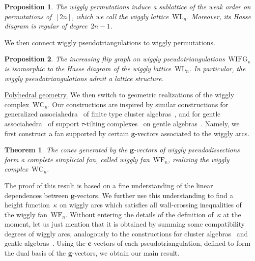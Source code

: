 \documentclass{amsart}
\newtheorem*{theorem*}{Theorem}%
\newtheorem*{proposition*}{Proposition}%
\theoremstyle{definition}
\renewcommand{\b}[1]{{\boldsymbol{#1}}} %
\newcommand{\darkblue}{\color{darkblue}} %
\newcommand{\defn}[1]{\textsl{\darkblue #1}} %
\newcommand{\para}[1]{\smallskip\noindent\uline{#1.}} %
\newcommand{\wigglyComplex}{\mathrm{WC}} %
\newcommand{\wigglyIncreasingFlipGraph}{\mathrm{WIFG}} %
\newcommand{\wigglyLattice}{\mathrm{WL}} %
\newcommand{\wigglyFan}{\mathrm{WF}} %
\begin{document}
\begin{proposition*}
The wiggly permutations induce a sublattice of the weak order on permutations of~$[2n]$, which we call the \defn{wiggly lattice}~$\wigglyLattice_n$. Moreover, its Hasse diagram is regular of degree~$2n-1$.
\end{proposition*}

We then connect wiggly pseudotriangulations to wiggly permutations.

\begin{proposition*}
The increasing flip graph on wiggly pseudotriangulations~$\wigglyIncreasingFlipGraph_n$ is isomorphic to the Hasse diagram of the wiggly lattice~$\wigglyLattice_n$. In particular, the wiggly pseudotriangulations admit a lattice structure.
\end{proposition*}

\para{Polyhedral geometry}
We then switch to geometric realizations of the wiggly complex~$\wigglyComplex_n$.
Our constructions are inspired by similar constructions for generalized associahedra~\cite{HohlwegLangeThomas,HohlwegPilaudStella} of finite type cluster algebras~\cite{FominZelevinsky-ClusterAlgebrasI,FominZelevinsky-ClusterAlgebrasII}, and for gentle associahedra~\cite{PaluPilaudPlamondon-nonkissing} of support \mbox{$\tau$-tilting} complexes~\cite{AdachiIyamaReiten} on gentle algebras~\cite{ButlerRingel}.
Namely, we first construct a fan supported by certain $\b{g}$-vectors associated to the wiggly arcs.

\begin{theorem*}
The cones generated by the $\b{g}$-vectors of wiggly pseudodissections form a complete simplicial fan, called \defn{wiggly fan}~$\wigglyFan_n$, realizing the wiggly complex~$\wigglyComplex_n$.
\end{theorem*}

The proof of this result is based on a fine understanding of the linear dependences between \mbox{$\b{g}$-vectors}.
We further use this understanding to find a height function~$\kappa$ on wiggly arcs which satisfies all wall-crossing inequalities of the wiggly fan~$\wigglyFan_n$.
Without entering the details of the definition of~$\kappa$ at the moment, let us just mention that it is obtained by summing some compatibility degrees of wiggly arcs, analogously to the constructions for cluster algebras~\cite{HohlwegPilaudStella} and gentle algebras~\cite{PaluPilaudPlamondon-nonkissing}.
Using the $\b{c}$-vectors of each pseudotriangulation, defined to form the dual basis of the $\b{g}$-vectors, we obtain our main result.
\end{document}
